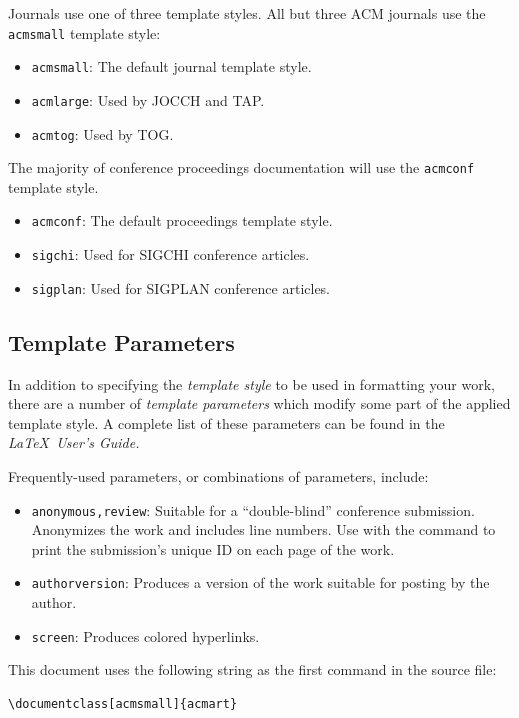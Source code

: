 \documentclass[acmsmall]{acmart}
\begin{document}
Journals use one of three template styles. All but three ACM journals
use the {\verb|acmsmall|} template style:
\begin{itemize}
\item {\texttt{acmsmall}}: The default journal template style.
\item {\texttt{acmlarge}}: Used by JOCCH and TAP.
\item {\texttt{acmtog}}: Used by TOG.
\end{itemize}

The majority of conference proceedings documentation will use the {\verb|acmconf|} template style.
\begin{itemize}
\item {\texttt{acmconf}}: The default proceedings template style.
\item{\texttt{sigchi}}: Used for SIGCHI conference articles.
\item{\texttt{sigplan}}: Used for SIGPLAN conference articles.
\end{itemize}

\subsection{Template Parameters}

In addition to specifying the {\itshape template style} to be used in
formatting your work, there are a number of {\itshape template parameters}
which modify some part of the applied template style. A complete list
of these parameters can be found in the {\itshape \LaTeX\ User's Guide.}

Frequently-used parameters, or combinations of parameters, include:
\begin{itemize}
\item {\texttt{anonymous,review}}: Suitable for a ``double-blind''
  conference submission. Anonymizes the work and includes line
  numbers. Use with the \texttt{\acmSubmissionID} command to print the
  submission's unique ID on each page of the work.
\item{\texttt{authorversion}}: Produces a version of the work suitable
  for posting by the author.
\item{\texttt{screen}}: Produces colored hyperlinks.
\end{itemize}

This document uses the following string as the first command in the
source file:
\begin{verbatim}
\documentclass[acmsmall]{acmart}
\end{verbatim}
\end{document}
